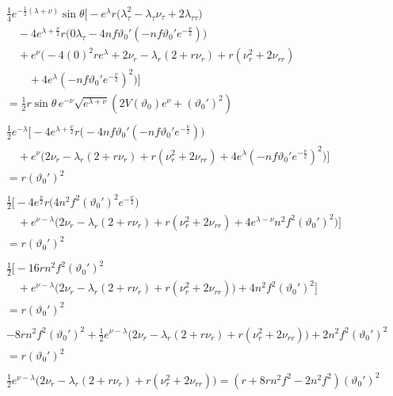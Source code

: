 \documentclass[12pt]{article}
\begin{document}
\begin{align}
& \frac{1}{4} e^{-\frac{1}{2}(\lambda + \nu)} \sin\theta \Big[ 
  - e^{\lambda} r 
   \big( \lambda_{\tau}^2 
       - \lambda_{\tau} \nu_{\tau} 
       + 2 \lambda_{\tau\tau} \big) \nonumber \\
   & \quad - 4 e^{\lambda + \frac{\nu}{2}} r 
     \big( 0 \lambda_{\tau} 
          - 4 n f \vartheta_0' (-n f \vartheta_0' e^{-\frac{\nu}{2}}) \big) \nonumber\\
 & \quad + e^{\nu} \Big(
     -4 (0)^2 r e^{\lambda}
     + 2 \nu_r 
     - \lambda_r (2 + r \nu_r)
     + r (\nu_r^2 + 2 \nu_{rr}) \nonumber \\
     & \qquad + 4 e^{\lambda} (-n f \vartheta_0' e^{-\frac{\nu}{2}})^2
   \Big)
\Big] \nonumber \\
&= \frac{1}{2} r \sin\theta \, e^{-\nu} \sqrt{e^{\lambda + \nu}}
  \left( 2 V(\vartheta_0) e^{\nu} + (\vartheta_0')^2 \right) \nonumber \\ \nonumber \\
& \frac{1}{2} e^{-\lambda} \Big[ 
   - 4 e^{\lambda + \frac{\nu}{2}} r 
     \big(
          - 4 n f \vartheta_0' (-n f \vartheta_0' e^{-\frac{\nu}{2}}) \big) \nonumber\\
 & \quad + e^{\nu} \Big(
     2 \nu_r 
     - \lambda_r (2 + r \nu_r)
     + r (\nu_r^2 + 2 \nu_{rr}) + 4 e^{\lambda} (-n f \vartheta_0' e^{-\frac{\nu}{2}})^2
   \Big)
\Big] \nonumber \\
&= r (\vartheta_0')^2 \nonumber \\ \nonumber \\
& \frac{1}{2} \Big[ 
   - 4 e^{\frac{\nu}{2}} r 
     \big(
           4 n^2 f^2 (\vartheta_0')^2 e^{-\frac{\nu}{2}} \big) \nonumber\\
 & \quad + e^{\nu-\lambda} \Big(
     2 \nu_r 
     - \lambda_r (2 + r \nu_r)
     + r (\nu_r^2 + 2 \nu_{rr}) + 4 e^{\lambda-\nu} n^2 f^2 (\vartheta_0')^2
   \Big)
\Big] \nonumber \\
&= r (\vartheta_0')^2 \nonumber \\ \nonumber \\
& \frac{1}{2} \Big[ -16 r n^2 f^2 (\vartheta_0')^2  \nonumber\\
 & \quad + e^{\nu-\lambda} \Big(
     2 \nu_r 
     - \lambda_r (2 + r \nu_r)
     + r (\nu_r^2 + 2 \nu_{rr})
     \Big)
     + 4 n^2 f^2 (\vartheta_0')^2
\Big] \nonumber \\
&= r (\vartheta_0')^2 \nonumber \\ \nonumber \\
& -8 r n^2 f^2 (\vartheta_0')^2 + \frac{1}{2} e^{\nu-\lambda} \Big(
     2 \nu_r 
     - \lambda_r (2 + r \nu_r)
     + r (\nu_r^2 + 2 \nu_{rr})
     \Big)
     + 2 n^2 f^2 (\vartheta_0')^2 \nonumber \\
&= r (\vartheta_0')^2 \nonumber \\ \nonumber \\
& \frac{1}{2} e^{\nu-\lambda} \Big(
     2 \nu_r 
     - \lambda_r (2 + r \nu_r)
     + r (\nu_r^2 + 2 \nu_{rr})
     \Big) 
= (r + 8 r n^2 f^2 - 2 n^2 f^2) (\vartheta_0')^2
\end{align}
\end{document}
